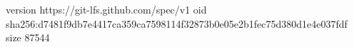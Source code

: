 version https://git-lfs.github.com/spec/v1
oid sha256:d7481f9db7e4417ca359ca7598114f32873b0e05e2b1fec75d380d1e4e037fdf
size 87544
